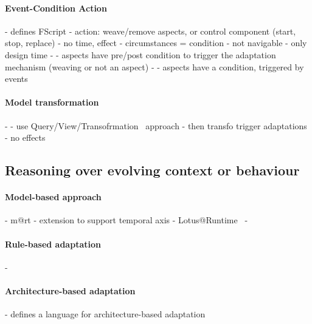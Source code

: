 \paragraph{Event-Condition Action}
- \cite{DBLP:conf/soco/DavidL06} defines FScript
	- action: weave/remove aspects, or control component (start, stop, replace)
 	- no time, effect
 	- circumstances = condition
 	- not navigable
 	- only design time
- \cite{DBLP:conf/icws/CharfiDM09}
	- aspects have pre/post condition to trigger the adaptation mechanism (weaving or not an aspect) 
- \cite{DBLP:journals/scp/ParraBCD11}
	- aspects have a condition, triggered by events
	
\paragraph{Model transformation}
- \cite{DBLP:conf/icse/ChenPYNZ14}
	- use Query/View/Transofrmation~\cite{QVT:Spec} approach
	- then transfo trigger adaptations
	- no effects
		 
	 
	 
	 
	 
	 
	 
\subsection{Reasoning over evolving context or behaviour}

\paragraph{Model-based approach}
- \gls{m@rt} \cite{DBLP:journals/computer/BlairBF09, DBLP:journals/computer/MorinBJFS09}
	- extension to support temporal axis \cite{DBLP:conf/seke/0001FNMKT14, DBLP:conf/models/0001FNMKBT14}
- Lotus@Runtime~\cite{DBLP:conf/icse/BarbosaLMJ17}
- \cite{DBLP:conf/icse/ChenPYNZ14}
		
\paragraph{Rule-based adaptation}
- \cite{DBLP:conf/icse/ArcainiRS15, DBLP:conf/icse/TaharaOH17, DBLP:conf/eurosys/GraceHPBCT08}

\paragraph{Architecture-based adaptation}
- \cite{DBLP:journals/jss/ChengG12} defines a language for architecture-based adaptation

